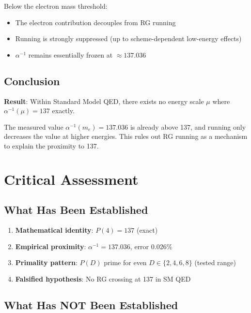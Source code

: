 \documentclass[11pt,a4paper]{article}
\begin{document}
Below the electron mass threshold:
\begin{itemize}
    \item The electron contribution decouples from RG running
    \item Running is strongly suppressed (up to scheme-dependent low-energy effects)
    \item $\alpha^{-1}$ remains essentially frozen at $\approx 137.036$
\end{itemize}

\subsection{Conclusion}

\textbf{Result}: Within Standard Model QED, there exists no energy scale $\mu$ where $\alpha^{-1}(\mu) = 137$ exactly.

The measured value $\alpha^{-1}(m_e) = 137.036$ is already above 137, and running only decreases the value at higher energies. This rules out RG running as a mechanism to explain the proximity to 137.

\section{Critical Assessment}

\subsection{What Has Been Established}

\begin{enumerate}
    \item \textbf{Mathematical identity}: $P(4) = 137$ (exact)
    \item \textbf{Empirical proximity}: $\alpha^{-1} = 137.036$, error 0.026\%
    \item \textbf{Primality pattern}: $P(D)$ prime for even $D \in \{2,4,6,8\}$ (tested range)
    \item \textbf{Falsified hypothesis}: No RG crossing at 137 in SM QED
\end{enumerate}

\subsection{What Has NOT Been Established}
\end{document}
